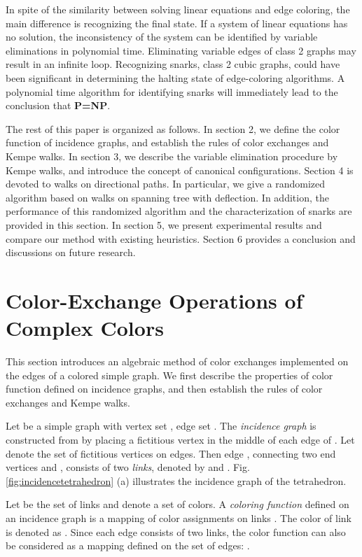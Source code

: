 \documentclass[11pt]{article}
\begin{document}
In spite of the similarity between solving linear equations and edge coloring, the main difference is  recognizing the final state. If a system of linear equations has no solution, the inconsistency of the system can be identified by variable eliminations in polynomial time. Eliminating variable edges of class 2 graphs may result in an infinite loop. Recognizing snarks, class 2 cubic graphs, could have been significant in determining the halting state of edge-coloring algorithms. A polynomial time algorithm for identifying snarks will immediately lead to the conclusion that {\bf P=NP}. 

The rest of this paper is organized as follows. In section 2, we define the color function of incidence graphs, and establish the rules of color exchanges and Kempe walks. In section 3, we describe the variable elimination procedure by Kempe walks, and introduce the concept of canonical configurations. Section 4 is devoted to walks on directional paths. In particular, we give a randomized algorithm based on walks on spanning tree with deflection. In addition, the performance of this randomized algorithm and the characterization of snarks are provided in this section. In section 5, we present experimental results and compare our method with existing heuristics. Section 6 provides a conclusion and discussions on future research.

\section{Color-Exchange Operations of Complex Colors}

This section introduces an algebraic method of color exchanges implemented on the edges of a colored simple graph. We first describe the properties of color function defined on incidence graphs, and then establish the rules of color exchanges and Kempe walks. 

Let  be a simple graph with vertex set , edge set . The {\it incidence graph}  is constructed from  by placing a fictitious vertex in the middle of each edge of . Let  denote the set of fictitious vertices on edges. Then edge , connecting two end vertices  and , consists of two {\it links}, denoted by  and . Fig. \ref{fig:incidencetetrahedron} (a) illustrates the incidence graph of the tetrahedron.

Let  be the set of links and  denote a set of  colors. A {\it coloring function}  defined on an incidence graph  is a mapping of color assignments on links . The color of link  is denoted as . Since each edge  consists of two links, the color function  can also be considered as a mapping defined on the set of edges: .	
\end{document}
